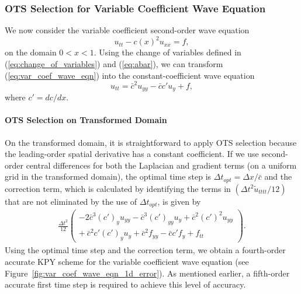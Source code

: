 \documentclass[twocolumn]{article} %
\newcommand{\beq}{\begin{equation}}
\newcommand{\eeq}{\end{equation}}
\newcommand{\bea}{\begin{eqnarray}}
\newcommand{\eea}{\end{eqnarray}}
\def\tu{\tilde{u}}
\def\cbar{\bar{c}}
\def\dt{\Delta t}
\def\dx{\Delta x}
\begin{document}
\subsubsection*{OTS Selection for Variable Coefficient Wave Equation}
We now consider the variable coefficient second-order wave equation
\beq
    u_{tt} - c(x)^2 u_{xx} = f,
    \label{eq:var_coef_wave_eqn}
\eeq
on the domain $0 < x < 1$.  Using the change of variables defined in 
(\ref{eq:change_of_variables}) and (\ref{eq:abar}), we can transform 
(\ref{eq:var_coef_wave_eqn}) into the constant-coefficient wave equation
\beq
  u_{tt} = \cbar^2 u_{yy} - \cbar c' u_y + f,
\eeq
where $c' = dc/dx$.


\paragraph*{OTS Selection on Transformed Domain}
On the transformed domain, it is straightforward to apply OTS selection 
because the leading-order spatial derivative has a constant coefficient.  
If we use second-order central differences for both the Laplacian and gradient 
terms (on a uniform grid in the transformed domain), the optimal time step is 
$\dt_{opt} = \dx/\cbar$ and the correction term, which is calculated by 
identifying the terms in $\left(\dt^2 \tu_{tttt}/12\right)$ that are not 
eliminated by the use of $\dt_{opt}$, is given by
\bea
  \frac{\dt^2}{12} 
  \left(
    \begin{array}{l}
        -2 \cbar^3 (c')_y u_{yy}
        -\cbar^3 (c')_{yy} u_{y}
        + \cbar^2 (c')^2 u_{yy} 
        \\
        +\ \cbar^2 c' (c')_y u_{y}
        + \cbar^2 f_{yy}
        - \cbar c' f_y
        + f_{tt}
    \end{array}
  \right).
\eea
Using the optimal time step and the correction term, we obtain a fourth-order
accurate KPY scheme for the variable coefficient wave equation 
(see Figure~\ref{fig:var_coef_wave_eqn_1d_error}).  As mentioned earlier,
a fifth-order accurate first time step is required to achieve this level of
accuracy.
\end{document}
